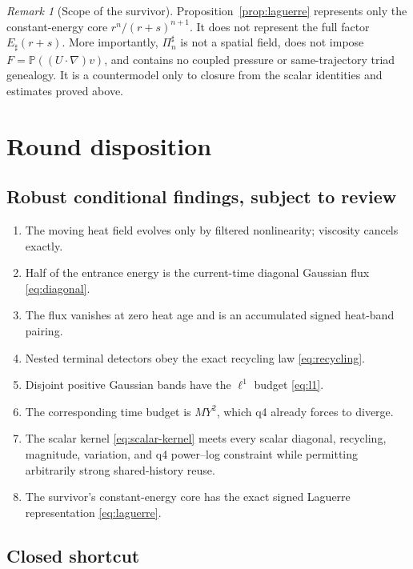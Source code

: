 \documentclass[11pt]{article}
\theoremstyle{remark}
\newtheorem{remark}[theorem]{Remark}
\newcommand{\Pp}{\mathbb P}
\begin{document}
\begin{remark}[Scope of the survivor]
Proposition~\ref{prop:laguerre} represents only the
constant-energy core \(r^n/(r+s)^{n+1}\).  It does not represent the
full factor \(E_\sharp(r+s)\).  More importantly,
\(\Pi_n^\sharp\) is not a spatial field, does not impose
\(F=\Pp((U\cdot\nabla)v)\), and contains no coupled pressure or
same-trajectory triad genealogy.  It is a countermodel only to closure
from the scalar identities and estimates proved above.
\end{remark}

\section{Round disposition}

\subsection*{Robust conditional findings, subject to review}

\begin{enumerate}
 \item The moving heat field evolves only by filtered nonlinearity;
 viscosity cancels exactly.
 \item Half of the entrance energy is the current-time diagonal Gaussian
 flux \eqref{eq:diagonal}.
 \item The flux vanishes at zero heat age and is an accumulated signed
 heat-band pairing.
 \item Nested terminal detectors obey the exact recycling law
 \eqref{eq:recycling}.
 \item Disjoint positive Gaussian bands have the \(\ell^1\) budget
 \eqref{eq:l1}.
 \item The corresponding time budget is \(MY^2\), which q4 already
 forces to diverge.
 \item The scalar kernel \eqref{eq:scalar-kernel} meets every scalar
 diagonal, recycling, magnitude, variation, and q4 power--log
 constraint while permitting arbitrarily strong shared-history reuse.
 \item The survivor's constant-energy core has the exact signed
 Laguerre representation \eqref{eq:laguerre}.
\end{enumerate}

\subsection*{Closed shortcut}
\end{document}
